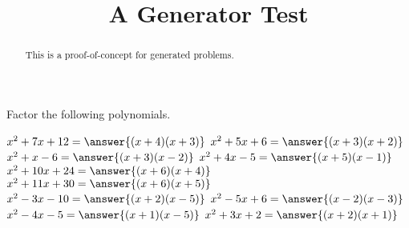 \documentclass{ximera}
\begin{document}
\title{A Generator Test}
\begin{abstract}
This is a proof-of-concept for generated problems.
\end{abstract}
\maketitle

Factor the following polynomials.

  $x^2 + 7x + 12 = \answer{(x + 4)(x + 3)}$
  $x^2 + 5x + 6 = \answer{(x + 3)(x + 2)}$
  $x^2 + x - 6 = \answer{(x + 3)(x - 2)}$
  $x^2 + 4x - 5 = \answer{(x + 5)(x - 1)}$
  $x^2 + 10x + 24 = \answer{(x + 6)(x + 4)}$
  $x^2 + 11x + 30 = \answer{(x + 6)(x + 5)}$
  $x^2 - 3x - 10 = \answer{(x + 2)(x - 5)}$
  $x^2 - 5x + 6 = \answer{(x - 2)(x - 3)}$
  $x^2 - 4x - 5 = \answer{(x + 1)(x - 5)}$
  $x^2 + 3x + 2 = \answer{(x + 2)(x + 1)}$
\end{document}
